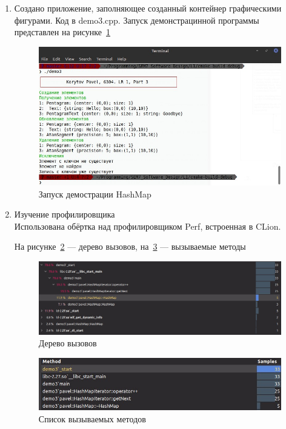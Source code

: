\documentclass[a4paper, 14pt]{extarticle}
\begin{document}
\begin{enumerate}
    \item Создано приложение, заполняющее созданный контейнер графическими фигурами. Код в demo3.cpp. Запуск демонстрацинной программы представлен на рисунке~\ref{img:map:demo}
    \begin{figure}[h]
        \centering
        \includegraphics[width=\textwidth]{./img/S006.jpg}
        \caption{Запуск демострации HashMap}%
        \label{img:map:demo}
    \end{figure}

    \item Изучение профилировщика\\
    Использована обёртка над профилировщиком Perf, встроенная в CLion.

    На рисунке~\ref{img:map:calltree} --- дерево вызовов, на~\ref{img:map:methods} --- вызываемые методы

    \begin{figure}[h]
        \centering
        \includegraphics[width=\textwidth]{./img/S008.jpg}
        \caption{Дерево вызовов}%
        \label{img:map:calltree}
    \end{figure}
    
    \begin{figure}[h]
        \centering
        \includegraphics[width=\textwidth]{./img/S009.jpg}
        \caption{Список вызываемых методов}%
        \label{img:map:methods}
    \end{figure}
    
\end{enumerate}
\end{document}
